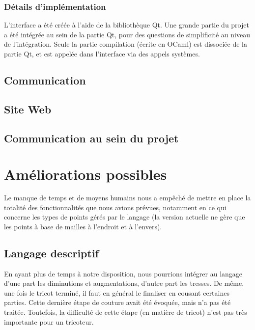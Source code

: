 \documentclass{article}
\begin{document}



\subsubsection{Détails d'implémentation}

L'interface a été créée à l'aide de la bibliothèque Qt. Une grande partie du projet a été intégrée au sein de la partie Qt, pour des questions de simplificité au niveau de l'intégration. Seule la partie compilation (écrite en OCaml) est dissociée de la partie Qt, et est appelée dans l'interface via des appels systèmes. 

\subsection{Communication}

\subsection{Site Web}

\subsection{Communication au sein du projet}

\section{Améliorations possibles}

Le manque de temps et de moyens humains nous a empêché de mettre en place la totalité des fonctionnalités que nous avions prévues, notamment en ce qui concerne les 
types de points gérés par le langage (la version actuelle ne gère que les points à base de mailles à l'endroit et à l'envers).

\subsection{Langage descriptif}
En ayant plus de temps à notre disposition, nous pourrions intégrer au langage d'une part les diminutions et augmentations, d'autre part les tresses. De même, une fois le tricot terminé, il faut en général le finaliser en cousant certaines parties. Cette dernière étape de couture avait été évoquée, mais n'a pas été traitée. Toutefois, la difficulté de cette étape (en matière de tricot) n'est pas très importante pour un tricoteur.
\end{document}
